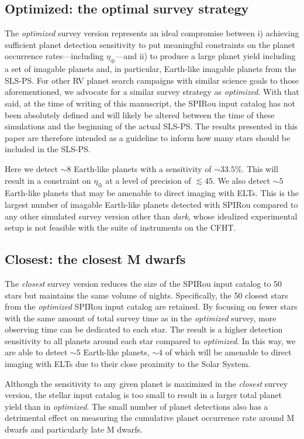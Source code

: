 \subsection{Optimized: the optimal survey strategy}
The \emph{optimized} survey version represents an ideal compromise between i) achieving sufficient planet
detection sensitivity to put meaningful constraints on the planet occurrence rates---including
$\eta_{\oplus}$---and ii) to produce a large planet yield including a set of imagable planets and, in
particular, Earth-like imagable planets from the SLS-PS. For other RV planet search campaigns with similar
science goals to those aforementioned, we advocate for a similar survey strategy as \emph{optimized}. With that
said, at the time of writing of this manuscript, the SPIRou input catalog has not been absolutely defined and
will likely be altered between the time of these
simulations and the beginning of the actual SLS-PS. The results presented in this paper are therefore intended as
a guideline to inform how many stars should be included in the SLS-PS.

Here we detect $\sim 8$ Earth-like planets with a sensitivity of $\sim 33.5$\%. This will result in a
constraint on $\eta_{\oplus}$ at a level of precision of $\lesssim 45$. We also detect $\sim 5$ Earth-like
planets that may be amenable to direct imaging with ELTs. This is the largest number of imagable Earth-like
planets detected with SPIRou compared to any other simulated survey version other than \emph{dark}, whose
idealized experimental setup is not feasible with the suite of instruments on the CFHT.

\subsection{Closest: the closest M dwarfs}
The \emph{closest} survey version reduces the size of the SPIRou input catalog to 50 stars but maintains
the same volume of nights. Specifically, the 50 closest stars from the \emph{optimized} SPIRou
input catalog are retained.
By focusing on fewer stars with the same amount of total survey time as in the \emph{optimized}
survey, more observing time can be dedicated to each star. The result is
a higher detection sensitivity to all planets around each star compared to \emph{optimized}.
In this way, we are able to detect $\sim 5$ Earth-like planets, $\sim 4$ of which will be amenable to
direct imaging with ELTs due to their close proximity to the Solar System. 

Although the sensitivity to any given planet is maximized in the \emph{closest} survey version, the stellar
input catalog is too small to result in a larger total planet yield than in \emph{optimized}. The small number
of planet detections also has a detrimental effect on measuring the cumulative planet occurrence rate
around M dwarfs and particularly late M dwarfs.

